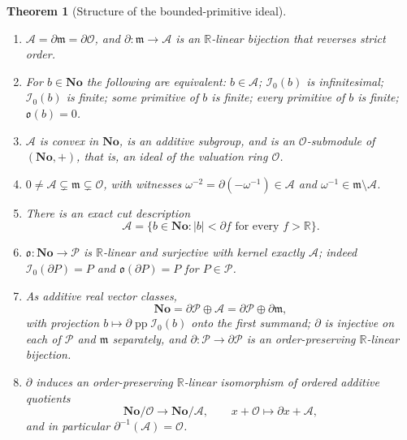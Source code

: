 \documentclass[11pt,letterpaper]{article}
\numberwithin{equation}{section}
\newtheorem{theorem}{Theorem}[section]
\theoremstyle{definition}
\theoremstyle{remark}
\newcommand{\No}{\mathbf{No}}
\newcommand{\R}{\mathbb R}
\newcommand{\der}{\partial}
\newcommand{\Ofin}{\mathcal O}
\newcommand{\mm}{\mathfrak m}
\newcommand{\Pcl}{\mathcal P}
\newcommand{\Acl}{\mathcal A}
\newcommand{\Izero}{\mathcal I_{0}}
\newcommand{\Obs}{\mathfrak o}
\newcommand{\pp}{\operatorname{pp}}
\newcommand{\abs}[1]{\lvert#1\rvert}
\begin{document}
\begin{theorem}[Structure of the bounded-primitive ideal]
\label{diff:thm:idealstructure}
\begin{enumerate}[label=\textup{(\roman*)},leftmargin=2.4em]
\item $\Acl=\der\mm=\der\Ofin$, and $\der:\mm\to\Acl$ is an $\R$-linear
bijection that \emph{reverses} strict order.
\item For $b\in\No$ the following are equivalent: $b\in\Acl$; $\Izero(b)$ is
infinitesimal; $\Izero(b)$ is finite; some primitive of $b$ is finite; every
primitive of $b$ is finite; $\Obs(b)=0$.
\item $\Acl$ is convex in $\No$, is an additive subgroup, and is an
$\Ofin$-submodule of $(\No,+)$, that is, an ideal of the valuation ring
$\Ofin$.
\item $0\neq\Acl\subsetneq\mm\subsetneq\Ofin$, with witnesses
$\omega^{-2}=\der(-\omega^{-1})\in\Acl$ and $\omega^{-1}\in\mm\setminus\Acl$.
\item There is an exact cut description
\begin{equation}\label{diff:eq:Icut}
 \Acl=\{b\in\No:\abs b<\der f\text{ for every }f>\R\}.
\end{equation}
\item $\Obs:\No\to\Pcl$ is $\R$-linear and surjective with kernel exactly
$\Acl$; indeed $\Izero(\der P)=P$ and $\Obs(\der P)=P$ for $P\in\Pcl$.
\item As additive real vector classes,
\begin{equation}\label{diff:eq:directsum}
 \No=\der\Pcl\oplus\Acl=\der\Pcl\oplus\der\mm,
\end{equation}
with projection $b\mapsto\der\pp\Izero(b)$ onto the first summand; $\der$ is
injective on each of $\Pcl$ and $\mm$ separately, and
$\der:\Pcl\to\der\Pcl$ is an order-\emph{preserving} $\R$-linear bijection.
\item $\der$ induces an order-preserving $\R$-linear isomorphism of ordered
additive quotients
\begin{equation}\label{diff:eq:quotientiso}
 \No/\Ofin\longrightarrow\No/\Acl,
 \qquad x+\Ofin\longmapsto \der x+\Acl,
\end{equation}
and in particular $\der^{-1}(\Acl)=\Ofin$.
\end{enumerate}
\end{theorem}
\end{document}
